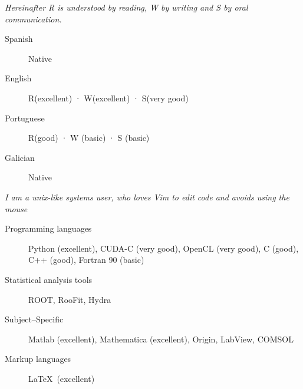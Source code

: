 \documentclass[9pt]{resumetemplate}
\begin{document}
\begin{minipage}[t]{0.45\textwidth}
	\vspace{-\baselineskip} %


\emph{Hereinafter R is understood by reading, W by writing and S by oral
communication.}%

\begin{description}
  \item[Spanish]  Native
  \item[English]  R(excellent) · W(excellent) · S(very good)
  \item[Portuguese]  R(good) · W (basic) · S (basic)
  \item[Galician]  Native
\end{description}
%	
%	
\end{minipage}
%
\hfill
%
\begin{minipage}[t]{0.5\textwidth}
	\vspace{-\baselineskip} %


\emph{I am a unix-like systems user, who loves Vim to edit code and avoids using
the mouse}

\begin{description}
  \item%
	  [Programming languages]
	  Python (excellent),
	  CUDA-C (very good), OpenCL (very good), C (good), C++ (good),
	  Fortran 90 (basic)
  \item%
	  [Statistical analysis tools]
		ROOT, RooFit, Hydra
  \item
	  [Subject--Specific]
		Matlab (excellent), Mathematica (excellent),
		Origin, LabView, COMSOL
  \item
	  [Markup languages]
	  \LaTeX\, (excellent)
\end{description}
\end{minipage}
\end{document}
